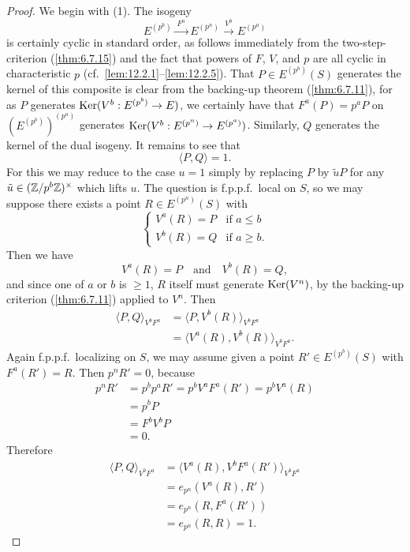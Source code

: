 \begin{proof}
We begin with (1). The isogeny
\[
E^{(p^b)} \xrightarrow{\ F^a\ } E^{(p^n)} \xrightarrow{\ V^b\ } E^{(p^a)}
\]
is certainly cyclic in standard order, as follows immediately from the two-step-criterion (\ref{thm:6.7.15}) and the fact that powers of $F$, $V$, and $p$ are all cyclic in characteristic $p$ (cf.\ \ref{lem:12.2.1}--\ref{lem:12.2.5}). That $P \in E^{(p^b)}(S)$ generates the kernel of this composite is clear from the backing-up theorem (\ref{thm:6.7.11}), for as $P$ generates $\operatorname{Ker}(V^b : E^{(p^b)} \to E)$, we certainly have that $F^a(P) = p^a P$ on $(E^{(p^b)})^{(p^a)}$ generates $\operatorname{Ker}(V^b : E^{(p^n)} \to E^{(p^a)})$. Similarly, $Q$ generates the kernel of the dual isogeny. It remains to see that
\[
\langle P, Q \rangle = 1 .
\]
For this we may reduce to the case $u = 1$ simply by replacing $P$ by $\tilde{u} P$ for any $\tilde{u} \in (\mathbb{Z}/p^b\mathbb{Z})^\times$ which lifts $u$. The question is f.p.p.f.\ local on $S$, so we may suppose there exists a point $R \in E^{(p^n)}(S)$ with
\[
\begin{cases}
V^a(R) = P & \text{if } a \le b \\
V^b(R) = Q & \text{if } a \ge b .
\end{cases}
\]
Then we have
\[
V^a(R) = P \quad\text{and}\quad V^b(R) = Q ,
\]
and since one of $a$ or $b$ is $\ge 1$, $R$ itself must generate $\operatorname{Ker}(V^n)$, by the backing-up criterion (\ref{thm:6.7.11}) applied to $V^n$. Then
\[
\begin{aligned}
\langle P, Q \rangle_{V^b F^a} &= \langle P, V^b(R) \rangle_{V^b F^a} \\
&= \langle V^a(R), V^b(R) \rangle_{V^b F^a} .
\end{aligned}
\]
Again f.p.p.f.\ localizing on $S$, we may assume given a point $R' \in E^{(p^b)}(S)$ with $F^a(R') = R$. Then $p^n R' = 0$, because
\[
\begin{aligned}
p^n R' &= p^b p^a R' = p^b V^a F^a(R') = p^b V^a(R) \\
&= p^b P \\
&= F^b V^b P \\
&= 0 .
\end{aligned}
\]
Therefore
\[
\begin{aligned}
\langle P, Q \rangle_{V^b F^a} &= \langle V^a(R), V^b F^a(R') \rangle_{V^b F^a} \\
&= e_{p^n}(V^a(R), R') \\
&= e_{p^n}(R, F^a(R')) \\
&= e_{p^n}(R, R) = 1 .
\end{aligned}
\]
\end{proof}
